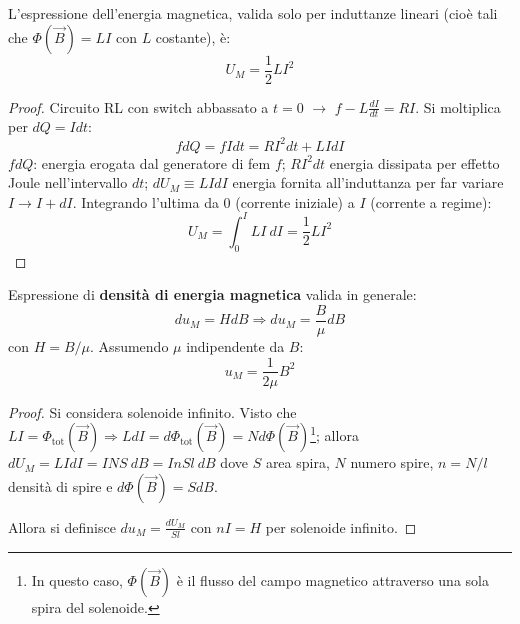 \documentclass[a4paper]{scrartcl}
\numberwithin{equation}{subsection}
\theoremstyle{style1}
\newenvironment{boxenv}[1][]{
    \begin{eqbox}[#1]
    }{
   \end{eqbox}
}
\begin{document}
L'espressione dell'energia magnetica, valida solo per induttanze lineari (cio\`e tali che $\Phi(\vec{B}) = L I$ con $L$ costante), \`e:
\begin{equation}
	U_M = \frac{1}{2}LI^2
\end{equation}
\begin{boxenv}[]
\begin{proof}
	Circuito RL con switch abbassato a $t=0$ $\to$ $f - L \frac{d I}{d t} = RI$. Si moltiplica per $dQ = Idt$:
	\[
	fdQ =f I dt= RI^2 dt + L I dI
	\] 
$fdQ$: energia erogata dal generatore di fem $f$; $RI^2 dt$ energia dissipata per effetto Joule nell'intervallo $dt$; $dU_M \equiv LIdI$ energia fornita all'induttanza per far variare $I\to I+dI$. Integrando l'ultima da $0$ (corrente iniziale) a $I$ (corrente a regime):
\[
U_M = \int_{0} ^I LI \ dI = \frac{1}{2}LI^2
\] 

\end{proof}
\end{boxenv}
\noindent Espressione di \textbf{densit\`a di energia magnetica} valida in generale:
\begin{equation}
	du_M = HdB \Rightarrow du_M = \frac{B}{\mu }dB
\end{equation}
con $H = B / \mu $. Assumendo $\mu $ indipendente da $B$:
\begin{equation}
	u_M = \frac{1}{2\mu }B^2
\end{equation}
\begin{boxenv}[]
\begin{proof}
	Si considera solenoide infinito. Visto che $LI = \Phi_\text{tot}(\vec{B}) \Rightarrow LdI = d\Phi_\text{tot}(\vec{B}) = N d\Phi(\vec{B})$\footnote{In questo caso, $\Phi(\vec{B})$ \`e il flusso del campo magnetico attraverso una sola spira del solenoide.}; allora $dU_M = LIdI = INS\ dB = InSl\ dB$ dove $S$ area spira, $N$ numero spire, $n = N / l$ densit\`a di spire e $d\Phi(\vec{B}) = SdB$. 

	Allora si definisce $du_M = \frac{dU_M}{Sl}$ con $nI = H$ per solenoide infinito.
\end{proof}
\end{boxenv}
\end{document}
